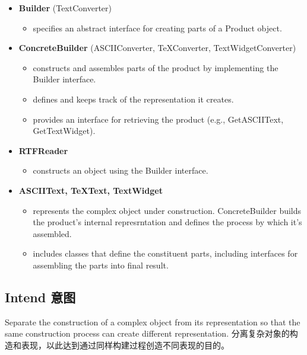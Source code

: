\begin{itemize}
\small
\item \textbf{Builder} (TextConverter)

	\begin{itemize}
		\item specifies an abstract interface for creating parts of a Product object.
	\end{itemize}

\item \textbf{ConcreteBuilder} (ASCIIConverter, TeXConverter, TextWidgetConverter)

	\begin{itemize}
		\item constructs and assembles parts of the product by implementing the Builder interface.

		\item defines and keeps track of the representation it creates.

		\item provides an interface for retrieving the product (e.g., GetASCIIText, GetTextWidget).
	\end{itemize}

\item \textbf{RTFReader}

	\begin{itemize}
		\item constructs an object using the Builder interface.
	\end{itemize}

\item \textbf{ASCIIText, TeXText, TextWidget}

	\begin{itemize}
		\item represents the complex object under construction. ConcreteBuilder builds the product's internal represrntation and defines the process by which it's assembled.

		\item includes classes that define the constituent parts, including interfaces for assembling the parts into final result.
	\end{itemize}
\normalize
\end{itemize}

\subsection{Intend 意图}

Separate the construction of a complex object from its representation so that the same construction process can create different representation.
分离复杂对象的构造和表现，以此达到通过同样构建过程创造不同表现的目的。

